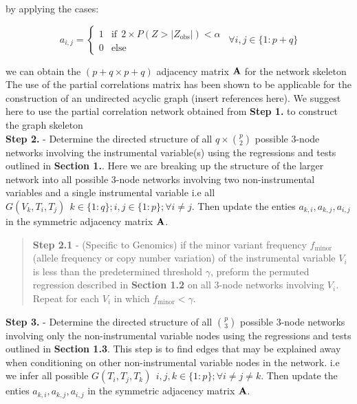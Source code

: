 \documentclass[12pt]{report}
\begin{document}
by applying the cases:

\[  a_{i,j} = \begin{cases}1 & \text{if} \ \ 2\times P(Z>|Z_{\text{obs}}|)<\alpha \\
                                      0 & \text{else} 
  \end{cases} \ \ \forall i,j \in \{1:p+q\}\]

we can obtain the $(p+q \times p+q)$ adjacency matrix $\bf A$ for the network skeleton\\


The use of the partial correlations matrix has been shown to be applicable for the construction of an undirected acyclic graph (insert references here). We suggest here to use the partial correlation network obtained from \textbf{Step 1.} to construct the graph skeleton\\


\noindent \textbf{Step 2.} - Determine the directed structure of all $q\times {p\choose 2}$ possible 3-node networks involving the instrumental variable(s) using the regressions and tests outlined in \textbf{Section 1.}. Here we are breaking up the structure of the larger network into all possible 3-node networks involving two non-instrumental variables and a single instrumental variable i.e all $G(V_k, T_i, T_j) \ \ k \in \{1:q\}; i,j \in \{1:p\}; \forall i\neq j$. Then update the enties $a_{k,i}, a_{k,j}, a_{i,j}$ in the symmetric adjacency matrix $\bf A$. 

\begin{quote}
\textbf{Step 2.1} - (Specific to Genomics) if the minor variant frequency $f_{\text{minor}}$ (allele frequency or copy number variation) of the instrumental variable $V_i$ is less than the predetermined threshold $\gamma$, preform the permuted regression described in \textbf{Section 1.2} on all 3-node networks involving $V_i$. Repeat for each $V_i$ in which $f_{\text{minor}} < \gamma$. 
\end{quote}

\noindent \textbf{Step 3.} -  Determine the directed structure of all $p\choose 3$ possible 3-node networks involving only the non-instrumental variable nodes using the regressions and tests outlined in \textbf{Section 1.3}. This step is to find edges that may be explained away when conditioning on other non-instrumental variable nodes in the network. i.e we infer all possible $G(T_i, T_j, T_k) \ \ i,j,k\in\{1:p\}; \forall i\neq j\neq k$.  Then update the enties $a_{k,i}, a_{k,j}, a_{i,j}$ in the symmetric adjacency matrix $\bf A$. 
\end{document}

